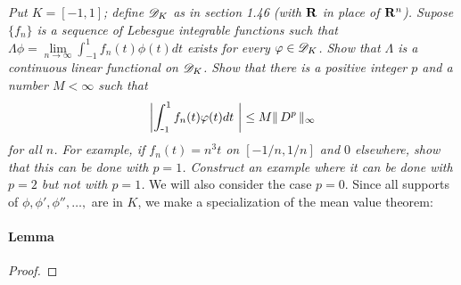 \textit{
Put $K=[-1,1]$; define ${\mathscr D}_{K}$ as in section 1.46 
(with ${\mathbf R}$ in place of ${\mathbf R}^{n}$). 
Supose $\{f_{n}\}$ is a sequence of Lebesgue integrable functions such that 
%
  $\Lambda\phi 
    = 
  \underset{n \to \infty}{\lim} \int_{\minus 1}^1 f_{n}(t)\phi(t)dt$
%
exists for every $\varphi\in{\mathscr D}_{K}$. 
Show that $\Lambda$ is a continuous linear functional on ${\mathscr D}_{K}$. 
Show that there is a positive integer $p$ and a number $M<\infty$ such that 
  \begin{align}
    \left\lvert 
      \int_{\text{\small{-}} 1}^1 f_n (t)\varphi (t) dt\
    \right\rvert
    \leq 
    M \| \,D^{p} \, \|_{\infty} 
  \nonumber
  \end{align}
for all $n$.
For example, if $f_{n}(t)=n^{3}t$ on $[\minus 1/n, 1/n]$ and $0$ elsewhere, 
show that this can be done with $p=1$. 
Construct an example where it can be done with $p=2$ but not with $p=1$.}
%
%
\renewcommand{\labelenumi}{(\roman{enumi})}%
%
\newline\newline\noindent
We will also consider the case $p=0$. Since all supports of %
%
  $\phi, \phi', \phi'', \dots, $ are in $K$, %
%
we make a specialization of the mean value theorem: %
%
\paragraph{Lemma}\label{2.3 Lemma}

%
\begin{proof}




\end{proof}
\renewcommand{\labelenumi}{$(\textit{\alph{enumi}})$}%